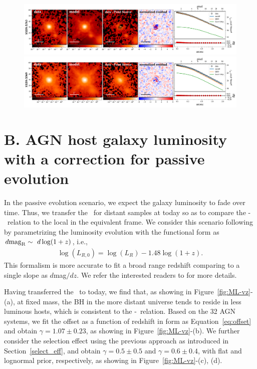 \documentclass[apj]{emulateapj}
\begin{document}
\begin{figure}
\centering
{
\includegraphics[height=0.25\textwidth]{fig/best_fit_SXDS-X763_SB_profile.pdf}
\includegraphics[height=0.25\textwidth]{fig/best_fit_SXDS-X969_SB_profile.pdf}
}
\end{figure} 

\clearpage
\section{B. AGN host galaxy luminosity with a correction for passive evolution}\label{sec:ml-ev}
In the passive evolution scenario, we expect the galaxy luminosity to fade over time. Thus, we transfer the \lhost\ for distant samples at today so as to compare the \mbh-\lhost\ relation to the local in the equivalent frame.
We consider this scenario following \citet{Ding2017b} by parametrizing the luminosity evolution with the functional form as
$d{\rm mag}_{\rm R}\sim~d\log(1+z)$, i.e.,
\begin{eqnarray}
\label{eq:L_relation}
\log(L_{R,0})=\log(L_{R}) - 1.48 \log (1+z).
\end{eqnarray} 
This formalism is more accurate to fit a broad range redshift comparing to a single slope as $d$mag$/dz$. We refer the interested readers to \citet[][section 5.4]{Ding2017b} for more details.

Having transferred the \lhost\ to today, we find that, as showing in Figure~\ref{fig:ML-vz}-(a), at fixed mass, the BH in the more distant universe tends to reside in less luminous hosts, which is consistent to the \mbh-\smass\ relation. Based on the 32 AGN systems, we fit the offset as a function of redshift in form as Equation~\ref{eq:offset} and obtain $\gamma = 1.07\pm0.23$, as showing in Figure~\ref{fig:ML-vz}-(b). We further consider the selection effect using the previous approach as introduced in Section~\ref{select_eff}, and obtain $\gamma = 0.5\pm0.5$ and $\gamma = 0.6\pm0.4$, with flat and lognormal prior, respectively, as showing in Figure~\ref{fig:ML-vz}-(c), (d).
\end{document}

